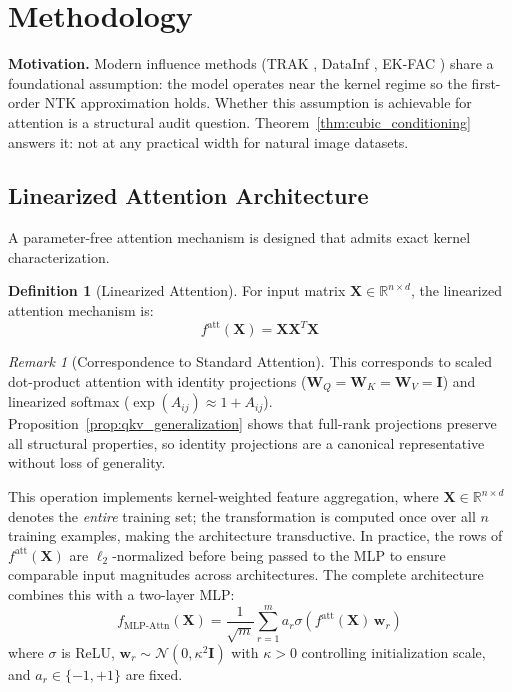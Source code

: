 \documentclass{article}
\theoremstyle{plain}
\theoremstyle{definition}
\newtheorem{definition}[theorem]{Definition}
\theoremstyle{remark}
\newtheorem{remark}[theorem]{Remark}
\newcommand{\R}{\mathbb{R}}
\begin{document}
\section{Methodology}
\label{sec:method}

\textbf{Motivation.} Modern influence methods (TRAK \citep{park2023trak}, DataInf \citep{kwon2023datainf}, EK-FAC \citep{grosse2023ekfac}) share a foundational assumption: the model operates near the kernel regime so the first-order NTK approximation holds. Whether this assumption is achievable for attention is a structural audit question. Theorem~\ref{thm:cubic_conditioning} answers it: not at any practical width for natural image datasets.

\subsection{Linearized Attention Architecture}

A parameter-free attention mechanism is designed that admits exact kernel characterization.

\begin{definition}[Linearized Attention]
For input matrix $\mathbf{X} \in \R^{n \times d}$, the linearized attention mechanism is:
\begin{equation}
f^{\text{att}}(\mathbf{X}) = \mathbf{X}\mathbf{X}^T\mathbf{X}
\end{equation}
\end{definition}

\begin{remark}[Correspondence to Standard Attention]
\label{rmk:qkv_correspondence}
This corresponds to scaled dot-product attention with identity projections ($\mathbf{W}_Q = \mathbf{W}_K = \mathbf{W}_V = \mathbf{I}$) and linearized softmax ($\exp(A_{ij}) \approx 1 + A_{ij}$). Proposition~\ref{prop:qkv_generalization} shows that full-rank projections preserve all structural properties, so identity projections are a canonical representative without loss of generality.
\end{remark}

This operation implements kernel-weighted feature aggregation, where $\mathbf{X} \in \R^{n \times d}$ denotes the \emph{entire} training set; the transformation is computed once over all $n$ training examples, making the architecture transductive. In practice, the rows of $f^{\text{att}}(\mathbf{X})$ are $\ell_2$-normalized before being passed to the MLP to ensure comparable input magnitudes across architectures. The complete architecture combines this with a two-layer MLP:
\begin{equation}
f_{\text{MLP-Attn}}(\mathbf{X}) = \frac{1}{\sqrt{m}} \sum_{r=1}^{m} a_r \sigma(f^{\text{att}}(\mathbf{X})\,\mathbf{w}_r)
\end{equation}
where $\sigma$ is ReLU, $\mathbf{w}_r \sim \mathcal{N}(0, \kappa^2 \mathbf{I})$ with $\kappa > 0$ controlling initialization scale, and $a_r \in \{-1, +1\}$ are fixed.
\end{document}
